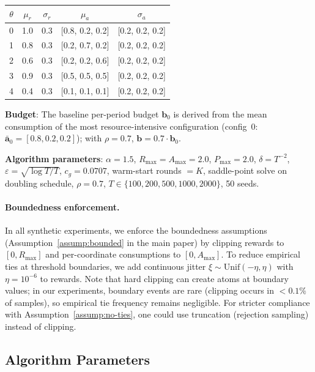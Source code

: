 \documentclass[11pt]{article}
\newcommand{\bb}{\mathbf{b}}
\newcommand{\ba}{\mathbf{a}}
\begin{document}
\begin{center}
\small
\begin{tabular}{ccccc}
\toprule
$\theta$ & $\mu_r$ & $\sigma_r$ & $\mu_a$ & $\sigma_a$ \\
\midrule
0 & 1.0 & 0.3 & [0.8, 0.2, 0.2] & [0.2, 0.2, 0.2] \\
1 & 0.8 & 0.3 & [0.2, 0.7, 0.2] & [0.2, 0.2, 0.2] \\
2 & 0.6 & 0.3 & [0.2, 0.2, 0.6] & [0.2, 0.2, 0.2] \\
3 & 0.9 & 0.3 & [0.5, 0.5, 0.5] & [0.2, 0.2, 0.2] \\
4 & 0.4 & 0.3 & [0.1, 0.1, 0.1] & [0.2, 0.2, 0.2] \\
\bottomrule
\end{tabular}
\end{center}

\textbf{Budget}: The baseline per-period budget $\bb_0$ is derived from the mean consumption of the most resource-intensive configuration (config~0: $\bar{\ba}_0 = [0.8, 0.2, 0.2]$); with $\rho = 0.7$, $\bb = 0.7 \cdot \bb_0$.

\textbf{Algorithm parameters}: $\alpha = 1.5$, $R_{\max} = A_{\max} = 2.0$, $P_{\max} = 2.0$, $\delta = T^{-2}$, $\varepsilon = \sqrt{\log T / T}$, $c_g = 0.0707$, warm-start rounds $= K$, saddle-point solve on doubling schedule, $\rho = 0.7$, $T \in \{100, 200, 500, 1000, 2000\}$, 50 seeds.

\paragraph{Boundedness enforcement.}
In all synthetic experiments, we enforce the boundedness assumptions (Assumption~\ref{assump:bounded} in the main paper) by clipping rewards to $[0, R_{\max}]$ and per-coordinate consumptions to $[0, A_{\max}]$. To reduce empirical ties at threshold boundaries, we add continuous jitter $\xi \sim \mathrm{Unif}(-\eta, \eta)$ with $\eta = 10^{-6}$ to rewards. Note that hard clipping can create atoms at boundary values; in our experiments, boundary events are rare (clipping occurs in $<0.1\%$ of samples), so empirical tie frequency remains negligible. For stricter compliance with Assumption~\ref{assump:no-ties}, one could use truncation (rejection sampling) instead of clipping.

\subsection{Algorithm Parameters}
\end{document}
